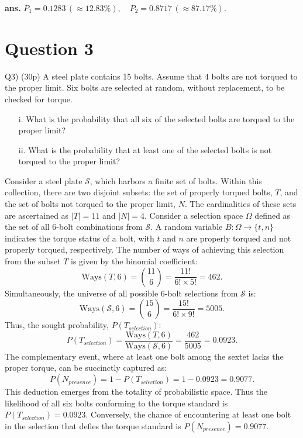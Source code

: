 \documentclass[12pt]{article}
\begin{document}
\vfill
\begin{flushright}
\textbf{ans.} \(P_1 = 0.1283 \, (\approx 12.83\%), \quad P_2 = 0.8717 \, (\approx 87.17\%).\)
\end{flushright}

\newpage
\section*{Question 3}
\begin{q}
Q3) (30p) A steel plate contains 15 bolts. Assume that 4 bolts are not torqued to the proper limit. Six bolts are selected at random, without replacement, to be checked for torque.
\begin{itemize}
\centering
\item[i.]  What is the probability that all six of the selected bolts are torqued to the proper limit?
\item[ii.] What is the probability that at least one of the selected bolts is not torqued to the proper limit?
\end{itemize}
\end{q}

Consider a steel plate \(\mathcal{S}\), which harbors a finite set of bolts. Within this collection, there are two disjoint subsets: the set of properly torqued bolts, \(T\), and the set of bolts not torqued to the proper limit, \(N\). The cardinalities of these sets are ascertained as \(|T| = 11\) and \(|N| = 4\). Consider a selection space \(\Omega\) defined as the set of all 6-bolt combinations from \(\mathcal{S}\). A random variable \(B: \Omega \to \{t, n\}\) indicates the torque status of a bolt, with \(t\) and \(n\) are properly torqued and not properly torqued, respectively. The number of ways of achieving this selection from the subset \(T\) is given by the binomial coefficient: \[ \text{Ways}(T,6) = \binom{11}{6} = \frac{11!}{6! \times 5!} = 462. \] Simultaneously, the universe of all possible 6-bolt selections from \(\mathcal{S}\) is: \[ \text{Ways}(\mathcal{S},6) = \binom{15}{6} = \frac{15!}{6! \times 9!} = 5005. \] Thus, the sought probability, \(P(T_{selection})\): \AnswerTag \[ P(T_{selection}) = \frac{\text{Ways}(T,6)}{\text{Ways}(\mathcal{S},6)} = \frac{462}{5005} = 0.0923. \] The complementary event, where at least one bolt among the sextet lacks the proper torque, can be succinctly captured as: \AnswerTag \[ P(N_{presence}) = 1 - P(T_{selection}) = 1- 0.0923 = 0.9077. \] This deduction emerges from the totality of probabilistic space. Thus the likelihood of all six bolts conforming to the torque standard is \(P(T_{selection}) = 0.0923\). Conversely, the chance of encountering at least one bolt in the selection that defies the torque standard is \(P(N_{presence}) = 0.9077\).
\end{document}
